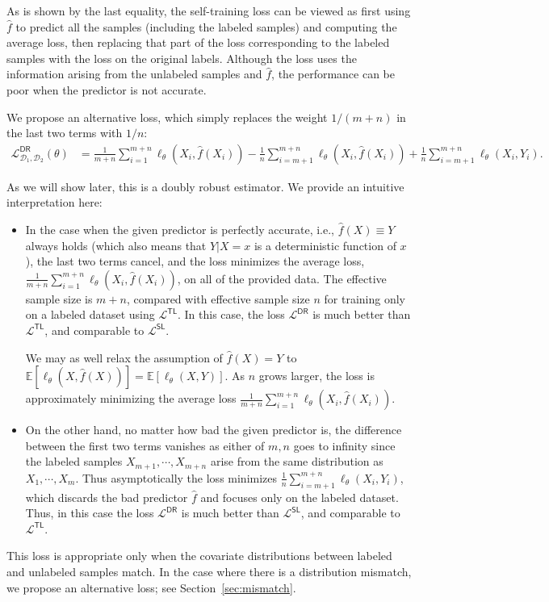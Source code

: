 As is shown by the last equality, the self-training loss can be viewed as first using $\hat f$ to predict all the samples (including the labeled samples) and computing the average loss, then replacing that part of the loss corresponding to the labeled samples  with the loss on the original labels. Although the loss uses the information arising from the unlabeled samples and $\hat f$, the performance can be poor when the predictor is not accurate.

We propose an alternative loss, which simply replaces the weight $1/(m+n)$ in the last two terms with $1/n$:
\begin{align}
\mathcal{L}^{\mathsf{DR}}_{\mathcal{D}_1,\mathcal{D}_2}(\theta) 
& = \frac{1}{m+n}  \sum_{i=1}^{m+n} \ell_\theta(X_i, \hat f(X_i)) -  \frac{1}{n} \sum_{i=m+1}^{m+n} \ell_\theta(X_i, \hat f(X_i))  + \frac{1}{n} \sum_{i=m+1}^{m+n} \ell_\theta(X_i, Y_i).  \label{eq:dr}
\end{align}

As we will show later,  this is a doubly robust estimator. We provide an intuitive interpretation here:
\begin{itemize}[leftmargin=24pt, itemsep=4pt]
    \vspace{-4pt}
    \item In the case when the given predictor is perfectly accurate, i.e., $\hat f(X) \equiv Y$ always holds (which also means that $Y |X=x$ is a deterministic function of $x$), the last two terms cancel, and the loss minimizes the average loss,  $\frac{1}{m+n}  \sum_{i=1}^{m+n} \ell_\theta(X_i, \hat f(X_i))$, on all of the provided data.  The effective sample size is $m+n$, compared with effective sample size $n$ for training only on a labeled dataset using $\mathcal{L}^{\mathsf{TL}}$. In this case, the loss $\mathcal{L}^{\mathsf{DR}}$ is much better than $\mathcal{L}^{\mathsf{TL}}$, and comparable to $\mathcal{L}^{\mathsf{SL}}$. 
    
    We may as well relax the assumption of $\hat f(X) = Y$  to $\mathbb{E}[\ell_\theta(X, \hat f(X))] = \mathbb{E}[\ell_\theta(X, Y)]$. As $n$ grows larger, the loss is  approximately minimizing the average loss  $\frac{1}{m+n}  \sum_{i=1}^{m+n} \ell_\theta(X_i, \hat f(X_i))$.
    \item On the other hand, no matter how bad  the  given predictor is,  the difference between the first two terms vanishes as either of  $m, n$ goes to infinity since the 
    labeled samples $X_{m+1},\cdots, X_{m+n}$ arise from the same distribution as $X_1,\cdots, X_m$. Thus asymptotically the loss minimizes $ \frac{1}{n} \sum_{i=m+1}^{m+n} \ell_\theta(X_i, Y_i)$, which discards the bad predictor $\hat f$  and focuses only on the labeled dataset. Thus, in this case the loss $\mathcal{L}^{\mathsf{DR}}$ is much better than $\mathcal{L}^{\mathsf{SL}}$, and comparable to $\mathcal{L}^{\mathsf{TL}}$.
\end{itemize}
This loss is appropriate only when the covariate distributions between labeled and unlabeled samples match. In the case where there is a distribution mismatch, we propose an alternative loss; see Section~\ref{sec:mismatch}. 


